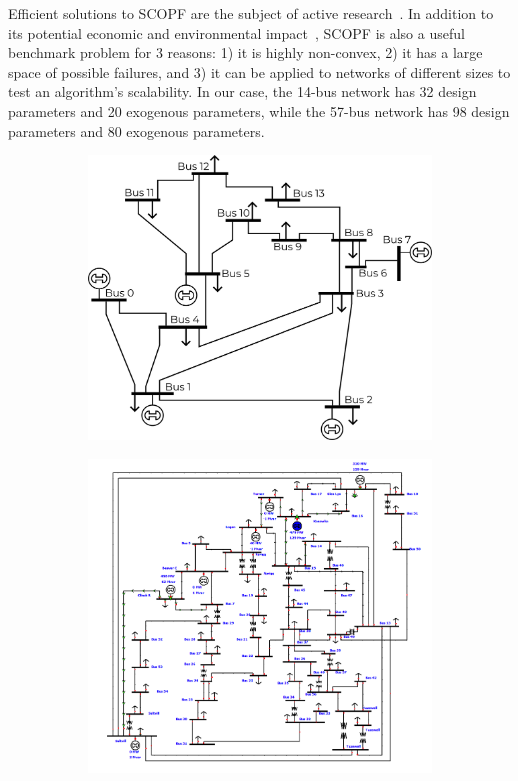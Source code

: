 Efficient solutions to SCOPF are the subject of active research~\cite{capitanescuStateoftheartChallengesFuture2011,u.s.departmentofenergyGridOptimizationCompetition}. In addition to its potential economic and environmental impact~\cite{cainHistoryOptimalPower2012}, SCOPF is also a useful benchmark problem for 3 reasons: 1) it is highly non-convex, 2) it has a large space of possible failures, and 3) it can be applied to networks of different sizes to test an algorithm's scalability. In our case, the 14-bus network has 32 design parameters and 20 exogenous parameters, while the 57-bus network has 98 design parameters and 80 exogenous parameters.

\begin{figure}[tb]
    \centering
    \begin{subfigure}[t]{0.4\linewidth}
        \centering
        \includegraphics[width=\linewidth]{images/global_methods/base_14_bus.png}
    \end{subfigure}
    \begin{subfigure}[t]{0.4\linewidth}
        \centering
        \includegraphics[width=\linewidth]{images/global_methods/IEEE57.png}

\end{subfigure}
\end{figure}
